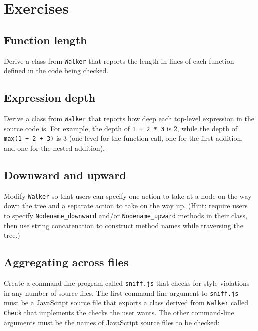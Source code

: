 \documentclass[krantzl]{krantz}
\begin{document}
\vspace{\baselineskip}

\section{Exercises}\label{style-checker-exercises}

\subsection*{Function length}


Derive a class from \texttt{Walker} that reports the length in lines of each function defined in the code being checked.

\subsection*{Expression depth}


Derive a class from \texttt{Walker} that reports how deep each top-level expression in the source code is.
For example,
the depth of \texttt{1 + 2 * 3} is 2,
while the depth of \texttt{max(1 + 2 + 3)} is 3
(one level for the function call, one for the first addition, and one for the nested addition).

\subsection*{Downward and upward}


Modify \texttt{Walker} so that users can specify
one action to take at a node on the way down the tree
and a separate action to take on the way up.
(Hint: require users to specify \texttt{Nodename\_downward} and/or \texttt{Nodename\_upward} methods in their class,
then use string concatenation to construct method names while traversing the tree.)

\subsection*{Aggregating across files}


Create a command-line program called \texttt{sniff.js}
that checks for style violations in any number of source files.
The first command-line argument to \texttt{sniff.js} must be a JavaScript source file
that exports a class derived from \texttt{Walker} called \texttt{Check}
that implements the checks the user wants.
The other command-line arguments must be the names of JavaScript source files to be checked:
\end{document}
